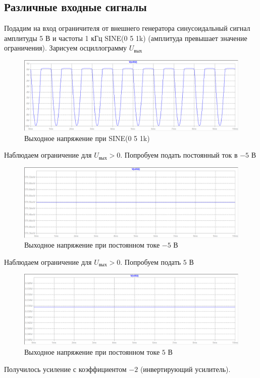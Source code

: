 \documentclass[a4paper, 12pt]{article}
\begin{document}
    \subsection{Различные входные сигналы}
    Подадим на вход ограничителя от внешнего генератора синусоидальный
    сигнал амплитуды 5 В и частоты 1 кГц SINE(0 5 1k) (амплитуда превышает значение ограничения).
    Зарисуем осциллограмму $U_\text{вых}$
    \begin{figure}[H]
        \centering
        \includegraphics[scale=0.46]{1task_sine_a5_f1k.png}
        \captionsetup{skip=0pt}
        \caption{Выходное напряжение при SINE(0 5 1k)}
        \label{fig:1task_sine_a5_f1k}
    \end{figure}
    \noindent Наблюдаем ограничение для $U_\text{вых}>0$. Попробуем подать постоянный ток в $-5$ В
    \begin{figure}[H]
        \centering
        \includegraphics[scale=0.46]{1task_const_m5.png}
        \captionsetup{skip=0pt}
        \caption{Выходное напряжение при постоянном токе $-5$ В}
        \label{fig:1task_const_m5}
    \end{figure}
    \noindent Наблюдаем ограничение для $U_\text{вых}>0$. Попробуем подать $5$ В
    \begin{figure}[H]
        \centering
        \includegraphics[scale=0.46]{1task_const_5.png}
        \captionsetup{skip=0pt}
        \caption{Выходное напряжение при постоянном токе $5$ В}
        \label{fig:1task_const_5}
    \end{figure}
    \noindent Получилось усиление с коэффициентом $-2$ (инвертирующий усилитель).
\end{document}
